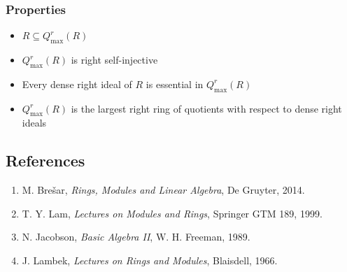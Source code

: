 \documentclass{article}
\begin{document}
\subsubsection*{Properties}
\begin{itemize}
  \item $R \subseteq Q^r_{\text{max}}(R)$
  \item $Q^r_{\text{max}}(R)$ is right self-injective
  \item Every dense right ideal of $R$ is essential in $Q^r_{\text{max}}(R)$
  \item $Q^r_{\text{max}}(R)$ is the largest right ring of quotients with respect to dense right ideals
\end{itemize}

\subsection*{References}
\begin{enumerate}
  \item M. Bre\v{s}ar, \textit{Rings, Modules and Linear Algebra}, De Gruyter, 2014.
  \item T. Y. Lam, \textit{Lectures on Modules and Rings}, Springer GTM 189, 1999.
  \item N. Jacobson, \textit{Basic Algebra II}, W. H. Freeman, 1989.
  \item J. Lambek, \textit{Lectures on Rings and Modules}, Blaisdell, 1966.
\end{enumerate}
\end{document}
